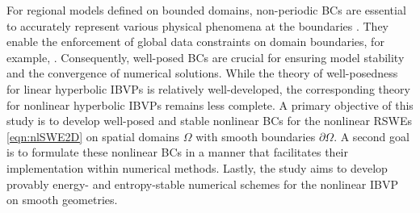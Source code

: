 \documentclass{article}
\numberwithin{equation}{section}
\theoremstyle{definition}
\begin{document}
For regional models defined on bounded domains, non-periodic BCs are essential to accurately represent various physical phenomena at the boundaries \cite{hsieh1983free, beletsky1997numerical}. They enable the enforcement of global data constraints on domain boundaries, for example, \cite{DaviesTerry2014, Baumhefner01011982, Caron2013, TermoniaDeckmynHamdi2009, Williamson1992}. Consequently, well-posed BCs are crucial for ensuring model stability and the convergence of numerical solutions. 
%
While the theory of well-posedness for linear hyperbolic IBVPs is relatively well-developed, the corresponding theory for nonlinear hyperbolic IBVPs remains less complete. A primary objective of this study is to develop well-posed and stable nonlinear BCs for the nonlinear RSWEs \eqref{eqn:nlSWE2D} on spatial domains $\Omega$ with smooth boundaries $\partial \Omega$. 
%
A second goal is to formulate these nonlinear BCs in a manner that facilitates their implementation within numerical methods. Lastly, the study aims to develop provably energy- and entropy-stable numerical schemes for the nonlinear IBVP on smooth geometries.
\end{document}
